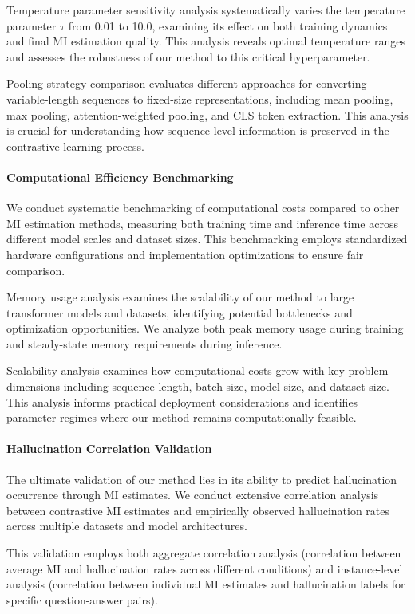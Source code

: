 Temperature parameter sensitivity analysis systematically varies the temperature parameter $\tau$ from 0.01 to 10.0, examining its effect on both training dynamics and final MI estimation quality. This analysis reveals optimal temperature ranges and assesses the robustness of our method to this critical hyperparameter.

Pooling strategy comparison evaluates different approaches for converting variable-length sequences to fixed-size representations, including mean pooling, max pooling, attention-weighted pooling, and CLS token extraction. This analysis is crucial for understanding how sequence-level information is preserved in the contrastive learning process.

\paragraph{Computational Efficiency Benchmarking}
We conduct systematic benchmarking of computational costs compared to other MI estimation methods, measuring both training time and inference time across different model scales and dataset sizes. This benchmarking employs standardized hardware configurations and implementation optimizations to ensure fair comparison.

Memory usage analysis examines the scalability of our method to large transformer models and datasets, identifying potential bottlenecks and optimization opportunities. We analyze both peak memory usage during training and steady-state memory requirements during inference.

Scalability analysis examines how computational costs grow with key problem dimensions including sequence length, batch size, model size, and dataset size. This analysis informs practical deployment considerations and identifies parameter regimes where our method remains computationally feasible.

\paragraph{Hallucination Correlation Validation}
The ultimate validation of our method lies in its ability to predict hallucination occurrence through MI estimates. We conduct extensive correlation analysis between contrastive MI estimates and empirically observed hallucination rates across multiple datasets and model architectures.

This validation employs both aggregate correlation analysis (correlation between average MI and hallucination rates across different conditions) and instance-level analysis (correlation between individual MI estimates and hallucination labels for specific question-answer pairs).


